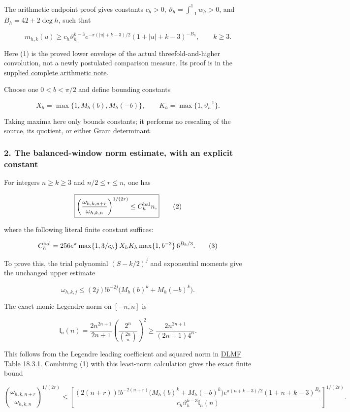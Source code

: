 The arithmetic endpoint proof gives constants \(c_h>0\), \(\vartheta_h=\int_{-1}^1w_h>0\), and \(B_h=42+2\deg h\), such that

\[
m_{h,k}(u)\ge c_h\vartheta_h^{k-3}
 e^{-\pi(|u|+k-3)/2}(1+|u|+k-3)^{-B_h},\qquad k\ge3.
\tag{1}
\]

Here (1) is the proved lower envelope of the actual threefold-and-higher convolution, not a newly postulated comparison measure. Its proof is in the \href{delivery/NOTE.tex}{supplied complete arithmetic note}.

Choose one \(0<b<\pi/2\) and define bounding constants

\[
X_h=\max\{1,M_h(b),M_h(-b)\},\qquad
K_h=\max\{1,\vartheta_h^{-1}\}.
\]

Taking maxima here only bounds constants; it performs no rescaling of the source, its quotient, or either Gram determinant.

\subsubsection{2. The balanced-window norm estimate, with an explicit constant}\label{endpoint-four_volume_threshold--the-balanced-window-norm-estimate-with-an-explicit-constant}

For integers \(n\ge k\ge3\) and \(n/2\le r\le n\), one has

\[
\boxed{\left(\frac{\omega_{h,k,n+r}}{\omega_{h,k,n}}\right)^{1/(2r)}
\le C_h^{\rm bal} n,}
\tag{2}
\]

where the following literal finite constant suffices:

\[
C_h^{\rm bal}=256e^\pi\max\{1,3/c_h\}\,X_hK_h
\max\{1,b^{-3}\}\,6^{B_h/3}.
\tag{3}
\]

To prove this, the trial polynomial \((S-k/2)^j\) and exponential moments give the unchanged upper estimate

\[
\omega_{h,k,j}\le(2j)!b^{-2j}
\bigl(M_h(b)^k+M_h(-b)^k\bigr).
\]

The exact monic Legendre norm on \([-n,n]\) is

\[
\mathfrak l_n(n)=\frac{2n^{2n+1}}{2n+1}
\left(\frac{2^n}{\binom{2n}{n}}\right)^2
\ge\frac{2n^{2n+1}}{(2n+1)4^n}.
\]

This follows from the Legendre leading coefficient and squared norm in \href{https://dlmf.nist.gov/18.3\#T1}{DLMF Table 18.3.1}. Combining (1) with this least-norm calculation gives the exact finite bound

\[
\left(\frac{\omega_{h,k,n+r}}{\omega_{h,k,n}}\right)^{1/(2r)}
\le\left[
\frac{(2(n+r))!b^{-2(n+r)}
\bigl(M_h(b)^k+M_h(-b)^k\bigr)
e^{\pi(n+k-3)/2}(1+n+k-3)^{B_h}}
{c_h\vartheta_h^{k-3}\mathfrak l_n(n)}
\right]^{1/(2r)}.
\tag{4}
\]

